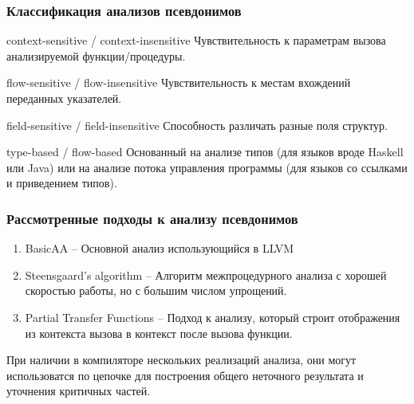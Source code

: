 \documentclass[utf8,russian]{beamer}
\begin{document}

\begin{frame}
\frametitle{Классификация анализов псевдонимов}

\begin{block}{context-sensitive / context-insensitive}
Чувствительность к параметрам вызова анализируемой функции/процедуры.
\end{block}

\begin{block}{flow-sensitive / flow-insensitive}
Чувствительность к местам вхождений переданных указателей.
\end{block}

\begin{block}{field-sensitive / field-insensitive}
Способность различать разные поля структур.
\end{block}

\begin{block}{type-based / flow-based}
Основанный на анализе типов (для языков вроде Haskell или Java) или на анализе потока управления программы (для языков со ссылками и приведением типов).
\end{block}

\end{frame}


\begin{frame}
\frametitle{Рассмотренные подходы к анализу псевдонимов}

\begin{enumerate}
\item BasicAA -- Основной анализ использующийся в LLVM
\item Steensgaard’s algorithm -- Алгоритм межпроцедурного анализа с хорошей скоростью работы, но с большим числом упрощений.
\item Partial Transfer Functions -- Подход к анализу, который строит отображения из контекста вызова в контекст после вызова функции.
\end{enumerate}

При наличии в компиляторе нескольких реализаций анализа, они могут использоватся по цепочке для построения общего неточного результата и уточнения критичных частей.
\end{frame}

\end{document}
